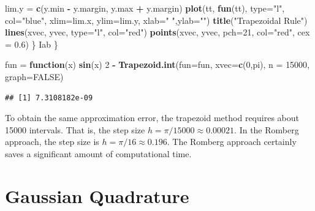 \documentclass[
]{book}
\newenvironment{Shaded}{\begin{snugshade}}{\end{snugshade}}
\newcommand{\AttributeTok}[1]{\textcolor[rgb]{0.13,0.29,0.53}{#1}}
\newcommand{\ConstantTok}[1]{\textcolor[rgb]{0.56,0.35,0.01}{#1}}
\newcommand{\ControlFlowTok}[1]{\textcolor[rgb]{0.13,0.29,0.53}{\textbf{#1}}}
\newcommand{\DecValTok}[1]{\textcolor[rgb]{0.00,0.00,0.81}{#1}}
\newcommand{\FloatTok}[1]{\textcolor[rgb]{0.00,0.00,0.81}{#1}}
\newcommand{\FunctionTok}[1]{\textcolor[rgb]{0.13,0.29,0.53}{\textbf{#1}}}
\newcommand{\NormalTok}[1]{#1}
\newcommand{\OtherTok}[1]{\textcolor[rgb]{0.56,0.35,0.01}{#1}}
\newcommand{\SpecialCharTok}[1]{\textcolor[rgb]{0.81,0.36,0.00}{\textbf{#1}}}
\newcommand{\StringTok}[1]{\textcolor[rgb]{0.31,0.60,0.02}{#1}}
\begin{document}
\begin{Shaded}
\begin{Highlighting}[]
\NormalTok{      lim.y }\OtherTok{=} \FunctionTok{c}\NormalTok{(y.min }\SpecialCharTok{{-}}\NormalTok{ y.margin, y.max }\SpecialCharTok{+}\NormalTok{ y.margin)}
      \FunctionTok{plot}\NormalTok{(tt, }\FunctionTok{fun}\NormalTok{(tt), }\AttributeTok{type=}\StringTok{"l"}\NormalTok{, }\AttributeTok{col=}\StringTok{"blue"}\NormalTok{, }\AttributeTok{xlim=}\NormalTok{lim.x, }\AttributeTok{ylim=}\NormalTok{lim.y, }\AttributeTok{xlab=}\StringTok{" "}\NormalTok{,}\AttributeTok{ylab=}\StringTok{""}\NormalTok{)}
      \FunctionTok{title}\NormalTok{(}\StringTok{"Trapezoidal Rule"}\NormalTok{)}
      \FunctionTok{lines}\NormalTok{(xvec, yvec, }\AttributeTok{type=}\StringTok{"l"}\NormalTok{, }\AttributeTok{col=}\StringTok{"red"}\NormalTok{)}
      \FunctionTok{points}\NormalTok{(xvec, yvec, }\AttributeTok{pch=}\DecValTok{21}\NormalTok{, }\AttributeTok{col=}\StringTok{"red"}\NormalTok{, }\AttributeTok{cex =} \FloatTok{0.6}\NormalTok{)}
\NormalTok{    \}}
\NormalTok{  Iab}
\NormalTok{\}}
\end{Highlighting}
\end{Shaded}

\begin{Shaded}
\begin{Highlighting}[]
\NormalTok{fun }\OtherTok{=} \ControlFlowTok{function}\NormalTok{(x) }\FunctionTok{sin}\NormalTok{(x)}
\DecValTok{2} \SpecialCharTok{{-}} \FunctionTok{Trapezoid.int}\NormalTok{(}\AttributeTok{fun=}\NormalTok{fun, }\AttributeTok{xvec=}\FunctionTok{c}\NormalTok{(}\DecValTok{0}\NormalTok{,pi), }\AttributeTok{n =} \DecValTok{15000}\NormalTok{, }\AttributeTok{graph=}\ConstantTok{FALSE}\NormalTok{)}
\end{Highlighting}
\end{Shaded}

\begin{verbatim}
## [1] 7.3108182e-09
\end{verbatim}

To obtain the same approximation error, the trapezoid method requires about 15000 intervals. That is, the step size \(h = \pi/15000 \approx 0.00021\). In the Romberg approach, the step size is \(h = \pi/16 \approx 0.196\). The Romberg approach certainly saves a significant amount of computational time.

\hfill\break

\hypertarget{gaussian-quadrature}{%
\section{Gaussian Quadrature}\label{gaussian-quadrature}}
\end{document}
